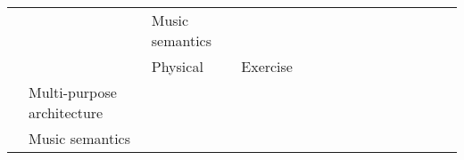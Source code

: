 \begin{tabular}{p{1.5cm}p{1.5cm}p{1.5cm}p{1.5cm}p{0.6cm}p{0.6cm}p{0.6cm}p{0.6cm}p{0.6cm}p{0.6cm}p{0.6cm}p{0.6cm}p{0.6cm}p{0.6cm}p{0.6cm}}
                                &                 & Music semantics &   &                                                             &                                                                                                           \cite{Stober2014} &                                                                        &                                      &                                                            &                      &                         &                               &                     &                         &                                                                      \\
                                &                 & Physical & Exercise &                                                             &                                                                                                            \cite{Ghosh2018} &                                                                        &                                      &                                                            &                      &                         &          \cite{Gordienko2017} &                     &                         &                                                                      \\
                                & Multi-purpose architecture &   &   &                                             \cite{Lee2018a} &                                                                                                           \cite{Zhang2018a} &                                                                        &                                      &                                                            &                      &                         &                               &    \cite{Deiss2018} &                         &                                                                      \\
                                & Music semantics &   &   &                                                             &                                                                                                           \cite{Raposo2017} &                                                                        &                                      &                                                            &                      &                         &                               &                     &                         &                                                                      \\

\end{tabular}

